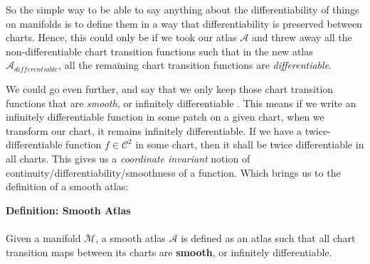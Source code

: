 \documentclass[10pt]{article}
\begin{document}
So the simple way to be able to say anything about the differentiability of things on manifolds is to define them in a way that differentiability is preserved between charts. Hence, this could  only be if we took our atlas $\mathcal{A}$ and threw away all the non-differentiable chart transition functions such that in the new atlas $\mathcal{A}_{differentiable}$,  all the remaining chart transition functions are \textit{differentiable}.

We could go even further, and say that we only keep those chart transition functions that are \textit{smooth}, or infinitely differentiable . This means if we write an infinitely differentiable function in some patch on a given chart, when we transform our chart, it remains infinitely differentiable. If we have a twice-differentiable function $f \in \mathcal{C}^2$ in some chart, then it shall be twice differentiable in all charts. This gives us a \textit{coordinate invariant} notion of continuity/differentiability/smoothness of a function.  Which brings us to the definition of a smooth atlas:\\

\begin{tcolorbox}
\textbf{Definition: Smooth Atlas} \\ \\ 
Given a manifold $\mathcal{M}$, a smooth atlas $\mathcal{A}$ is defined as an atlas such that all chart transition maps between its charts are \textbf{smooth}, or infinitely differentiable.
\end{tcolorbox}
\end{document}
